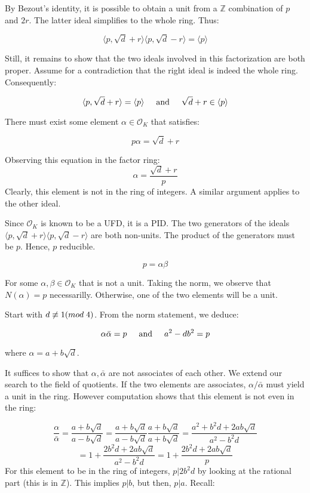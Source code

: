 \documentclass{article}
\def\ZZ{{\mathbb{Z}}}
\def\_{{\hspace{1mm}}}
\newcommand{\textAnd}{
    \hspace{5mm}
    \textrm{and}
    \hspace{5mm}
}
\newcommand{\<}{{
    \langle
}}
\def\>{{
    \rangle
}}
\def\ZZ{{\mathbb{Z}}}
\newcommand{\ringInt}{
    {\mathcal{O}}
}
\begin{document}
By Bezout's identity, it is possible to obtain a unit from 
a $\ZZ$ combination of $p$ and $2r$. The latter ideal simplifies 
to the whole ring. Thus:

\[
    \<p, \sqrt{d} + r\>\<p, \sqrt{d} - r\>
    = \<p\>
\]

Still, it remains to show that the two ideals involved in this 
factorization are both proper. Assume for a contradiction that 
the right ideal is indeed the whole ring. Consequently:

\[
    \<p, \sqrt{d}+r\> = \<p\> \textAnd 
    \sqrt{d}+r \in \<p\>
\]

There must exist some element $\alpha \in \ringInt_K$ that satisfies:

\[
   p\alpha = \sqrt{d}+r
\]

Observing this equation in the factor ring:
\[
    \alpha = \frac{\sqrt{d}+r}{p}
\]
Clearly, this element is not in the ring of integers. A similar 
argument applies to the other ideal. 

Since $\ringInt_K$ is known to be a UFD, it is a PID. The two 
generators of the ideals $\<p, \sqrt{d} + r\>\<p, \sqrt{d} - r\>$
are both non-units. The product of the generators must be $p$. 
Hence, $p$ reducible. 

\[
    p = \alpha \beta
\]

For some $\alpha, \beta \in \ringInt_K$ that is not a unit. 
Taking the norm, we observe that $N(\alpha) = p$ necessarilly. 
Otherwise, one of the two elements will be a unit. 

Start with $d \not\equiv 1(mod\_4)$. 
From the norm 
statement, we deduce:

\[
    \alpha \bar{\alpha} = p
    \textAnd 
    a^2-db^2 = p
\]

where $\alpha = a+b\sqrt{d}$. 

It suffices to show that $\alpha, \bar{\alpha}$ are not 
associates of each other. We extend our search to the field of 
quotients. If the two elements are associates, 
$\alpha / \bar{\alpha}$ must yield a unit in the ring. However 
computation shows that this element is not even in the ring:

\[
    \frac{\alpha}{\bar{\alpha}}
    = \frac{a+b\sqrt{d}}{a-b\sqrt{d}}   
    = \frac{a+b\sqrt{d}}{a-b\sqrt{d}}   
    \frac{a+b\sqrt{d}}{a+b\sqrt{d}}
    =
    \frac{a^2+b^2d+2ab\sqrt{d}}{a^2-b^2d}
\]
\[
    = 1+\frac{2b^2d+2ab\sqrt{d}}{a^2-b^2d}
    = 1+\frac{2b^2d+2ab\sqrt{d}}{p}
\]
For this element to be in the ring of integers, 
$p|2b^2d$ by looking at the rational part (this is in $\ZZ$). 
This implies $p|b$, but then, $p|a$. Recall:
\end{document}

